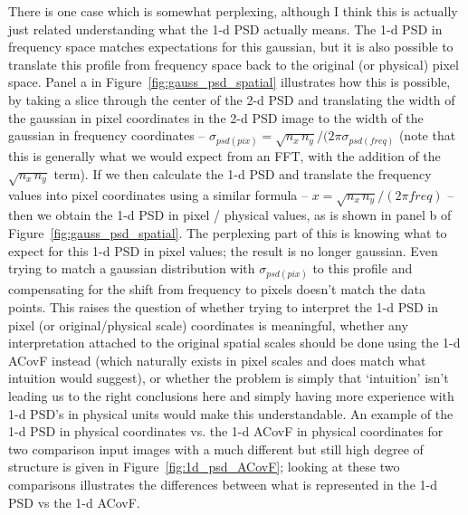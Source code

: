 \documentclass[11pt,preprint]{aastex}
\begin{document}
There is one case which is somewhat perplexing, although I think this is actually just related understanding what the 1-d PSD actually means. The 1-d PSD in frequency space matches expectations for this gaussian, but it is also possible to translate this profile from frequency space back to the original (or physical) pixel space. Panel a in Figure~\ref{fig:gauss_psd_spatial} illustrates how this is possible, by taking a slice through the center of the 2-d PSD and translating the width of the gaussian in pixel coordinates in the 2-d PSD image to the width of the gaussian in frequency coordinates -- $\sigma_{psd(pix)} = \sqrt{n_x\, n_y} / (2 \pi \sigma_{psd(freq)}$ (note that this is generally what we would expect from an FFT, with the addition of the $\sqrt{n_x\,n_y}$ term). If we then calculate the 1-d PSD and translate the frequency values into pixel coordinates using a similar formula -- $x = \sqrt{n_x\,n_y} / (2 \pi freq)$ -- then we obtain the 1-d PSD in pixel / physical values, as is shown in panel b of Figure~\ref{fig:gauss_psd_spatial}.  The perplexing part of this is knowing what to expect for this 1-d PSD in pixel values; the result is no longer gaussian. Even trying to match a gaussian distribution with $\sigma_{psd(pix)}$ to this profile and compensating for the shift from frequency to pixels doesn't match the data points. This raises the question of whether trying to interpret the 1-d PSD in pixel (or original/physical scale) coordinates is meaningful, whether any interpretation attached to the original spatial scales should be done using the 1-d ACovF instead (which naturally exists in pixel scales and does match what intuition would suggest), or whether the problem is simply that `intuition' isn't leading us to the right conclusions here and simply having more experience with 1-d PSD's in physical units would make this understandable. An example of the 1-d PSD in physical coordinates vs. the 1-d ACovF in physical coordinates for two comparison input images with a much different but still high degree of structure is given in Figure~\ref{fig:1d_psd_ACovF}; looking at these two comparisons illustrates the differences between what is represented in the 1-d PSD vs the 1-d ACovF.  \label{q:1dpsd}
\end{document}

